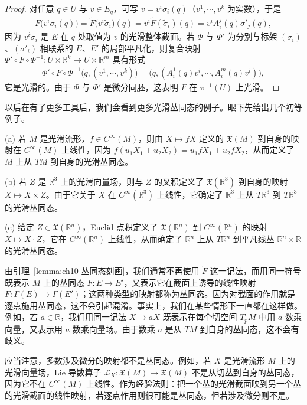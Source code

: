 \documentclass[../../main.tex]{subfiles}
\begin{document}
\begin{proof}
对任意 $q\in U$ 与 $v\in E_q$，可写 $v=v^i\sigma_i(q)$（$v^1,\cdots ,v^k$ 为实数），于是
\begin{align*}
F\big(v^i\sigma_i(q)\big)=\widetilde F\big(v^i\widetilde\sigma_i\big)(q)=v^i\widetilde F(\widetilde\sigma_i)(q)=v^i A_i^j(q)\sigma'_j(q),
\end{align*}
因为 $v^i\widetilde\sigma_i$ 是 $E$ 在 $q$ 处取值为 $v$ 的光滑整体截面。若 $\Phi$ 与 $\Phi'$ 为分别与标架 $(\sigma_i)$、$(\sigma'_i)$ 相联系的 $E$、$E'$ 的局部平凡化，则复合映射 $\Phi'\circ F\circ\Phi^{-1}\colon U\times\mathbb{R}^k\to U\times\mathbb{R}^m$ 具有形式
\begin{align*}
\Phi'\circ F\circ\Phi^{-1}\big(q,(v^1,\cdots ,v^k)\big)=\big(q,(A_i^1(q)v^i,\cdots ,A_i^m(q)v^i)\big),
\end{align*}
它是光滑的。由于 $\Phi$ 与 $\Phi'$ 是微分同胚，这表明 $F$ 在 $\pi^{-1}(U)$ 上光滑。
\end{proof}

以后在有了更多工具后，我们会看到更多光滑丛同态的例子。眼下先给出几个初等例子。

\begin{example}[流形上的丛同态]\label{example:ch10-流形上丛同态}
(a) 若 $M$ 是光滑流形，$f\in C^\infty(M)$，则由 $X\mapsto fX$ 定义的 $\mathfrak X(M)$ 到自身的映射在 $C^\infty(M)$ 上线性，因为 $f(u_1X_1+u_2X_2)=u_1fX_1+u_2fX_2$，从而定义了 $M$ 上从 $TM$ 到自身的光滑丛同态。

(b) 若 $Z$ 是 $\mathbb{R}^3$ 上的光滑向量场，则与 $Z$ 的叉积定义了 $\mathfrak X(\mathbb{R}^3)$ 到自身的映射 $X\mapsto X\times Z$。由于它关于 $X$ 在 $C^\infty(\mathbb{R}^3)$ 上线性，它确定了 $\mathbb{R}^3$ 上从 $T\mathbb{R}^3$ 到 $T\mathbb{R}^3$ 的光滑丛同态。

(c) 给定 $Z\in\mathfrak X(\mathbb{R}^n)$，Euclid 点积定义了 $\mathfrak X(\mathbb{R}^n)$ 到 $C^\infty(\mathbb{R}^n)$ 的映射 $X\mapsto X\cdot Z$，它在 $C^\infty(\mathbb{R}^n)$ 上线性，从而确定了 $\mathbb{R}^n$ 上从 $T\mathbb{R}^n$ 到平凡线丛 $\mathbb{R}^n\times\mathbb{R}$ 的光滑丛同态。
\end{example}

由引理~\ref{lemma:ch10-丛同态刻画}，我们通常不再使用 $\widetilde F$ 这一记法，而用同一符号既表示 $M$ 上的丛同态 $F\colon E\to E'$，又表示它在截面上诱导的线性映射 $F\colon\Gamma(E)\to\Gamma(E')$；这两种类型的映射都称为丛同态。因为对截面的作用就是逐点施用丛同态，这不会引起混淆。事实上，我们在某些情形下一直都在这样做。例如，若 $a\in\mathbb{R}$，我们用同一记法 $X\mapsto aX$ 既表示在每个切空间 $T_pM$ 中用 $a$ 数乘向量，又表示用 $a$ 数乘向量场。由于数乘 $a$ 是从 $TM$ 到自身的丛同态，这不会有歧义。

应当注意，多数涉及微分的映射都不是丛同态。例如，若 $X$ 是光滑流形 $M$ 上的光滑向量场，Lie 导数算子 $\mathcal L_X\colon\mathfrak X(M)\to\mathfrak X(M)$ 不是从切丛到自身的丛同态，因为它不在 $C^\infty(M)$ 上线性。作为经验法则：把一个丛的光滑截面映到另一个丛的光滑截面的线性映射，若逐点作用则很可能是丛同态，但若涉及微分则不是。
\end{document}
